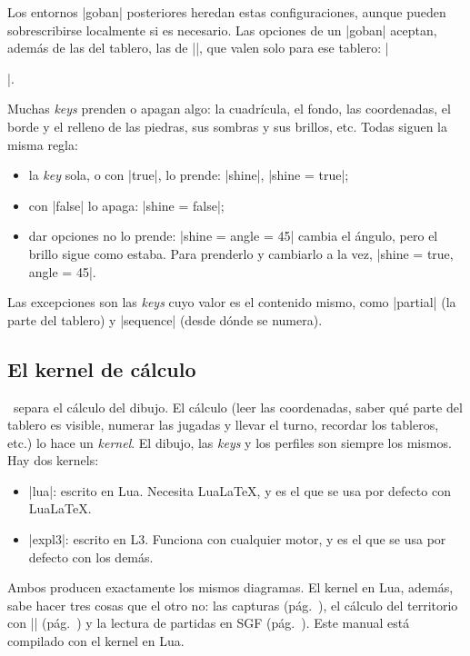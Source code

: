Los entornos |goban| posteriores heredan estas configuraciones, aunque pueden sobrescribirse localmente si es necesario. Las opciones de un |goban| aceptan, además de las del tablero, las de |\pgfgoset|, que valen solo para ese tablero: |\begin{goban}[9, stone = {radius = 4pt}, mark = {line = {color = red}}]|.

\label{subsec:prender}Muchas \emph{keys} prenden o apagan algo: la cuadrícula, el fondo, las coordenadas, el borde y el relleno de las piedras, sus sombras y sus brillos, etc. Todas siguen la misma regla:
\begin{itemize}
	\item la \emph{key} sola, o con |true|, lo prende: |shine|, |shine = true|;
	\item con |false| lo apaga: |shine = false|;
	\item dar opciones no lo prende: |shine = {angle = 45}| cambia el ángulo, pero el brillo sigue como estaba. Para prenderlo y cambiarlo a la vez, |shine = {true, angle = 45}|.
\end{itemize}
Las excepciones son las \emph{keys} cuyo valor es el contenido mismo, como |partial| (la parte del tablero) y |sequence| (desde dónde se numera).

\subsection{El kernel de cálculo}
\label{subsec:kernel}

\pgfgoname\ separa el cálculo del dibujo. El cálculo (leer las coordenadas, saber qué parte del tablero es visible, numerar las jugadas y llevar el turno, recordar los tableros, etc.) lo hace un \emph{kernel}. El dibujo, las \emph{keys} y los perfiles son siempre los mismos. Hay dos kernels:
\begin{itemize}
	\item |lua|: escrito en Lua. Necesita Lua\LaTeX, y es el que se usa por defecto con Lua\LaTeX.
	\item |expl3|: escrito en L3. Funciona con cualquier motor, y es el que se usa por defecto con los demás.
\end{itemize}

Ambos producen exactamente los mismos diagramas. El kernel en Lua, además, sabe hacer tres cosas que el otro no: las capturas (pág.~\pageref{subsec:capturas}), el cálculo del territorio con || (pág.~\pageref{subsec:territorio}) y la lectura de partidas en SGF (pág.~\pageref{subsec:sgf}). Este manual está compilado con el kernel en Lua.


\end{goban}
